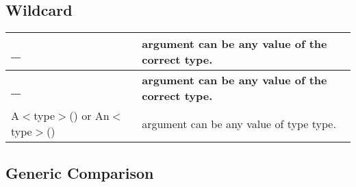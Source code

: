 \subsection*{Wildcard}

\tabulinesep=1mm
\begin{longtabu} spread 0pt [c]{*{2}{|X[-1]}|}
\hline
\rowcolor{\tableheadbgcolor}\textbf{ {\ttfamily \+\_\+}}&\textbf{ {\ttfamily argument} can be any value of the correct type.  }\\
\endfirsthead
\hline
\endfoot
\hline
\rowcolor{\tableheadbgcolor}\textbf{ {\ttfamily \+\_\+}}&\textbf{ {\ttfamily argument} can be any value of the correct type.  }\\
\endhead
{\ttfamily A$<$type$>$()} or {\ttfamily An$<$type$>$()}&{\ttfamily argument} can be any value of type {\ttfamily type}. \\
\end{longtabu}
\subsection*{Generic Comparison}

